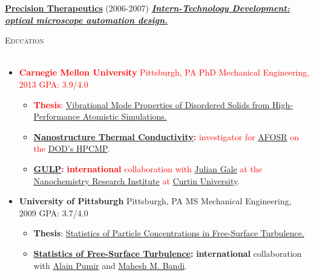\documentclass{article}
\newcommand{\area}[2]{\vspace*{-9pt} \begin{verse}\textbf{#1}   #2 \end{verse}  }
\newcommand{\lineunder}{\vspace*{-8pt} \\ \hspace*{-18pt} \hrulefill \\}
\newcommand{\header}[1]{{\hspace*{-15pt}\vspace*{6pt} \textsc{#1}} \vspace*{-6pt} \lineunder}
\newcommand{\employer}[3]{{ \textbf{#1} (#2) \underline{\textbf{\emph{#3}}}\\  }}
\newenvironment{achievements}{\begin{list}{$\bullet$}{\topsep 0pt \itemsep -2pt}}{\vspace*{4pt}\end{list}}
\newcommand{\schoolwithcourses}[3]{
 \textbf{#1} #2 $\bullet$ #3\\ 
\vspace*{5pt}
}
\begin{document}
\employer{\href{http://www.precisiontherapeutics.com/}{Precision Therapeutics}}{2006-2007}{Intern-Technology Development: optical microscope automation design.} 

\header{\large{Education}}

\begin{itemize}[leftmargin=*]
  \item \textcolor{red}{\textbf{Carnegie Mellon University} Pittsburgh, PA PhD Mechanical Engineering, 2013 GPA: 3.9/4.0}
  \begin{itemize}
    \item \textcolor{red}{\textbf{Thesis}: \href{http://jasonlarkin.github.io/projects-phd.html}
    {Vibrational Mode Properties of Disordered Solids from High-Performance Atomistic Simulations.}}
    \item \textcolor{red}{\textbf{\href{http://ntpl.me.cmu.edu/research.html}{Nanostructure Thermal Conductivity}:} investigator for  
\href{http://www.wpafb.af.mil/afrl/afosr/}{AFOSR} on the \href{http://www.hpcmo.hpc.mil/cms2/index.php}{DOD's HPCMP}.}
    \item \textcolor{red}{\textbf{\href{https://nanochemistry.curtin.edu.au/local/docs/gulp/gulp4.2_manual.pdf}{GULP}:} \textbf{international} collaboration with \href{http://nanochemistry.curtin.edu.au/people/staff.cfm/J.Gale}{Julian Gale} at the 
\href{http://nanochemistry.curtin.edu.au/}{Nanochemistry Research Institute} at \href{http://www.curtin.edu.au/}{Curtin University}.}
  \end{itemize}

  \item \textbf{University of Pittsburgh} Pittsburgh, PA MS Mechanical Engineering, 2009 GPA: 3.7/4.0
  \begin{itemize}
    \item \textbf{Thesis}: \href{http://jasonlarkin.github.io/projects-ms.html}{Statistics of Particle Concentrations in Free-Surface Turbulence.} 
    \item \textbf{\href{http://jasonlarkin.github.io/projects-ms.html}{Statistics of Free-Surface Turbulence}:} \textbf{international} collaboration with \href{http://perso.ens-lyon.fr/alain.pumir/Pumir_webpage.html}{Alain Pumir} and \href{https://groups.oist.jp/ciu/mahesh-m-bandi}{Mahesh M. Bandi}. 
  \end{itemize}


\end{itemize}
\end{document}
